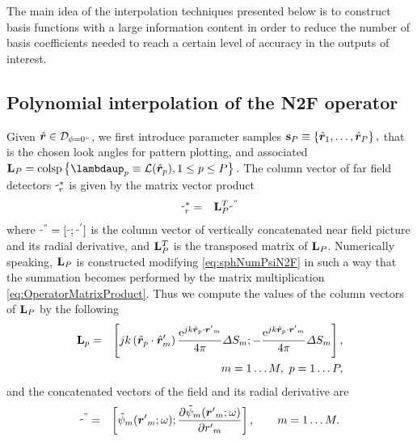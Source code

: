 \par The main idea of the interpolation techniques presented below is to construct basis functions with a large information content in order to reduce the number of basis coefficients needed to reach a certain level of accuracy in the outputs of interest. %

\subsection{Polynomial interpolation of the N2F operator} \label{sec:PolynomN2F}

\par Given $\hat{\mbfit{r}} \in \mathcal{D}_{\phi = 0\ensuremath{^\circ}}$, we first introduce parameter samples $\vect{S}_P \equiv \left \{ \hat{\mbfit{r}}_1, \ldots, \hat{\mbfit{r}}_P \right \},$ that is the chosen look angles for pattern plotting, and associated   $\mat{L}_P = \colspan{ \vect{\lambdaup}_p \equiv \mathcal{L}(\hat{\mbfit{r}}_p) , 1 \leq p \leq P}.$ The column vector of far field detectors $\vect{\psi}_r^*$ is given by the matrix vector product
\begin{eqnarray}
\label{eq:OperatorMatrixProduct}
\vect{\psi}_r^* &= & \mat{L}_P^T \vect{\psi}^"
\end{eqnarray} where $\vect{\psi}^{"} =  [\vect{\psi}; \vect{\psi}^{'}]$ is the column vector of vertically concatenated near field picture and its radial derivative, and $\mathbf{L}_P^T$ is the transposed matrix of $\mathbf{L}_P$. Numerically speaking, $\mathbf{L}_P$ is constructed modifying \eqref{eq:sphNumPsiN2F} in such a way that the summation becomes performed by the matrix multiplication \eqref{eq:OperatorMatrixProduct}. Thus we compute the values of the column vectors of $\mathbf{L}_P$ by the following
\begin{eqnarray}
\mat{L}_p & = &  \left [ jk  \left ( \hat{\mbfit{r}}_p \cdot \hat{\mbfit{r}}'_m \right ) \frac{\mrm{e}^{jk \hat{\mbfit{r}}_p \cdot \mbfit{r'}_m}}{4\pi} \Delta S_m ;  -  \frac{\mrm{e}^{jk \hat{\mbfit{r}}_p \cdot \mbfit{r'}_m}}{4\pi} \Delta S_m \right ], \nonumber \\
& & \hspace{1cm} m=1 \ldots M, \  p=1 \ldots P,
\end{eqnarray} and the concatenated vectors of the field and its radial derivative are
\begin{eqnarray}
\vect{\psi}^" & =&  \left [ \tilde{\psi}_m(\mbfit{r'}_m; \omega);  \frac{\partial{\tilde{\psi}_m(\mbfit{r'}_m; \omega)}}{\partial{r'}_m} \right ], \qquad m=1 \ldots M.
\end{eqnarray}

